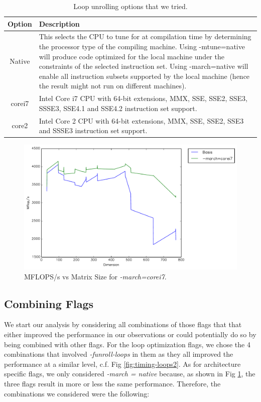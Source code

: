 \documentclass{article}
\begin{document}
\begin{table}
\begin{center}
    \begin{tabular}{ | c | p{10cm} |}
    \hline
    Option & Description \\ \hline
    Native  & This selects the CPU to tune for at compilation time by determining the processor type of the compiling machine. Using -mtune=native will produce code optimized for the local machine under the constraints of the selected instruction set. Using -march=native will enable all instruction subsets supported by the local machine (hence the result might not run on different machines).  \\ \hline
    corei7 & Intel Core i7 CPU with 64-bit extensions, MMX, SSE, SSE2, SSE3, SSSE3, SSE4.1 and SSE4.2 instruction set support. \\ \hline
    core2 & Intel Core 2 CPU with 64-bit extensions, MMX, SSE, SSE2, SSE3 and SSSE3 instruction set support. \\ \hline
    \end{tabular}
    \caption{Loop unrolling options that we tried.}
    \label{tab:arch-march}
\end{center}
\end{table}


  \begin{figure}[h]
    \centering
    \includegraphics[width=.7\textwidth]{timing-march.pdf}
    \caption{MFLOPS/s vs Matrix Size for \textit{-march=corei7}.}
    \label{fig:timing-march}
  \end{figure}
 
\subsection{Combining Flags}

We start our analysis by considering all combinations of those flags that that either improved the performance in our observations or could potentially do so by being combined with other flags. For the loop optimization flags, we chose the 4 combinations that involved \textit{-funroll-loops} in them as they all improved the performance at a similar level, c.f. Fig \ref{fig:timing-loops2}. As for architecture specific flags, we only considered \textit{-march = native} because, as shown in Fig \ref{fig:timing-march}, the three flags result in more or less the same performance.  Therefore, the combinations we considered were the following:
\end{document}
